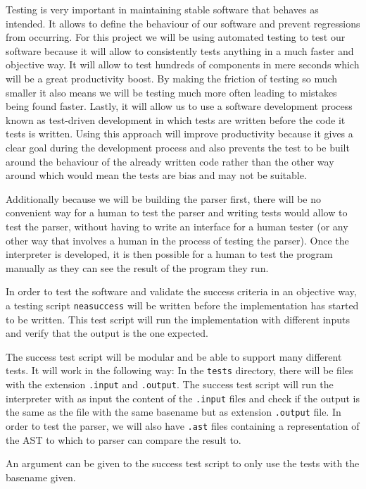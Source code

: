 \documentclass{article}
\begin{document}
Testing is very important in maintaining stable software that behaves as
intended. It allows to define the behaviour of our software and prevent
regressions from occurring. For this project we will be using automated testing
to test our software because it will allow to consistently tests anything in a
much faster and objective way. It will allow to test hundreds of components in
mere seconds which will be a great productivity boost. By making the friction
of testing so much smaller it also means we will be testing much more often
leading to mistakes being found faster. Lastly, it will allow us to use a
software development process known as test-driven development in which tests
are written before the code it tests is written. Using this approach will
improve productivity because it gives a clear goal during the development
process and also prevents the test to be built around the behaviour of the
already written code rather than the other way around which would mean the
tests are bias and may not be suitable.

Additionally because we will be building the parser first, there will be no
convenient way for a human to test the parser and writing tests would allow to
test the parser, without having to write an interface for a human tester (or
any other way that involves a human in the process of testing the parser). Once
the interpreter is developed, it is then possible for a human to test the
program manually as they can see the result of the program they run.

In order to test the software and validate the success criteria in an objective
way, a testing script \texttt{neasuccess} will be written before the
implementation has started to be written. This test script will run the
implementation with different inputs and verify that the output is the one
expected.

The success test script will be modular and be able to support many different
tests. It will work in the following way: In the \texttt{tests} directory,
there will be files with the extension \texttt{.input} and \texttt{.output}.
The success test script will run the interpreter with as input the content of
the \texttt{.input} files and check if the output is the same as the file with
the same basename but as extension \texttt{.output} file. In order to test the
parser, we will also have \texttt{.ast} files containing a representation of
the AST to which to parser can compare the result to.

An argument can be given to the success test script to only use the tests with
the basename given.
\end{document}
